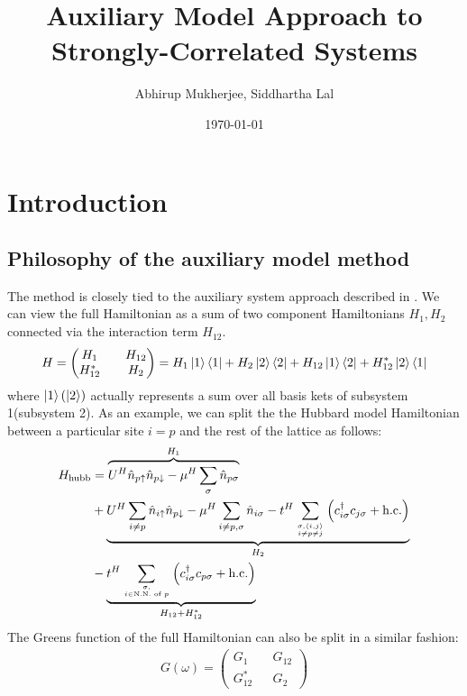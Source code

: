 \documentclass{report}
\title{\bf Auxiliary Model Approach to Strongly-Correlated Systems}
\author{\Large Abhirup Mukherjee, Siddhartha Lal}
\date{\Large \today}
\numberwithin{equation}{section}
\begin{document}
\maketitle
\tableofcontents
\newpage
\chapter{Introduction}

\section{Philosophy of the auxiliary model method}
The method is closely tied to the auxiliary system approach described in \cite{martin_2016}. We can view the full Hamiltonian as a sum of two component Hamiltonians \(H_1, H_2\) connected via the interaction term \(H_{12}\).
\begin{equation}\begin{aligned}
	H = \begin{pmatrix} H_1 && H_{12} \\ H_{12}^* && H_2 \end{pmatrix} = H_1 \ket{1}\bra{1} + H_2\ket{2}\bra{2} + H_{12}\ket{1}\bra{2} + H_{12}^*\ket{2}\bra{1}
\end{aligned}\end{equation}
where \(\ket{1}(\ket{2})\) actually represents a sum over all basis kets of subsystem 1(subsystem 2). As an example, we can split the the Hubbard model Hamiltonian between a particular site \(i = p\) and the rest of the lattice as follows:
\begin{equation}\begin{aligned}
	H_\text{hubb} &= \overbrace{U^H\hat n_{p \uparrow} \hat n_{p \downarrow} - \mu^H \sum_\sigma \hat n_{p \sigma}}^{H_1} \\
		      &+ \underbrace{U^H\sum_{i \neq p}\hat n_{i \uparrow} \hat n_{p \downarrow} - \mu^H \sum_{i \neq p, \sigma} \hat n_{i \sigma} -t^H\sum_{\sigma,\left<i,j \right>\atop{i \neq p \neq j}}\left(c^\dagger_{i\sigma} c_{j\sigma} + \text{h.c.}\right)}_{H_2}\\
		      & -\underbrace{t^H\sum_{\sigma,\atop{i \in \text{N.N. of }p}}\left(c^\dagger_{i\sigma} c_{p\sigma} + \text{h.c.}\right)}_{H_{12} + H_{12}^*}\\
\end{aligned}\end{equation}
The Greens function of the full Hamiltonian can also be split in a similar fashion:
\begin{equation}\begin{aligned}
	G(\omega) = \begin{pmatrix} G_1 && G_{12} \\ G_{12}^* && G_2 \end{pmatrix} 
\end{aligned}\end{equation}
\end{document}
